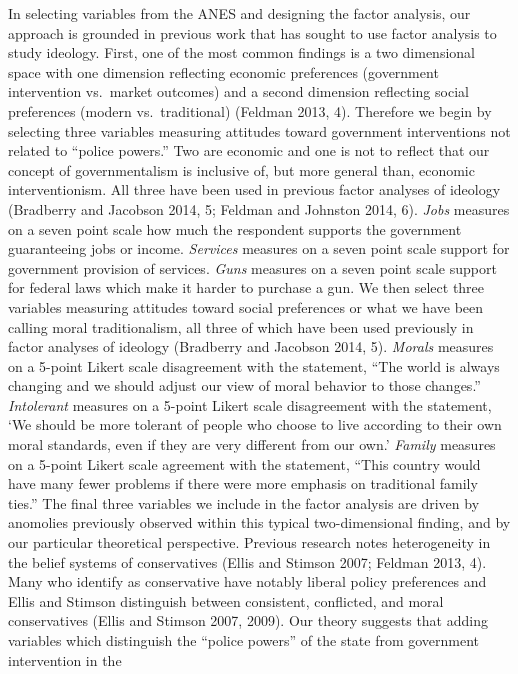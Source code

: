 \documentclass[12pt,]{article}
\begin{document}
In selecting variables from the ANES and designing the factor analysis,
our approach is grounded in previous work that has sought to use factor
analysis to study ideology. First, one of the most common findings is a
two dimensional space with one dimension reflecting economic preferences
(government intervention vs.~market outcomes) and a second dimension
reflecting social preferences (modern vs.~traditional) (Feldman 2013,
4). Therefore we begin by selecting three variables measuring attitudes
toward government interventions not related to ``police powers.'' Two
are economic and one is not to reflect that our concept of
governmentalism is inclusive of, but more general than, economic
interventionism. All three have been used in previous factor analyses of
ideology (Bradberry and Jacobson 2014, 5; Feldman and Johnston 2014, 6).
\emph{Jobs} measures on a seven point scale how much the respondent
supports the government guaranteeing jobs or income. \emph{Services}
measures on a seven point scale support for government provision of
services. \emph{Guns} measures on a seven point scale support for
federal laws which make it harder to purchase a gun. We then select
three variables measuring attitudes toward social preferences or what we
have been calling moral traditionalism, all three of which have been
used previously in factor analyses of ideology (Bradberry and Jacobson
2014, 5). \emph{Morals} measures on a 5-point Likert scale disagreement
with the statement, ``The world is always changing and we should adjust
our view of moral behavior to those changes.'' \emph{Intolerant}
measures on a 5-point Likert scale disagreement with the statement, `We
should be more tolerant of people who choose to live according to their
own moral standards, even if they are very different from our own.'
\emph{Family} measures on a 5-point Likert scale agreement with the
statement, ``This country would have many fewer problems if there were
more emphasis on traditional family ties.'' The final three variables we
include in the factor analysis are driven by anomolies previously
observed within this typical two-dimensional finding, and by our
particular theoretical perspective. Previous research notes
heterogeneity in the belief systems of conservatives (Ellis and Stimson
2007; Feldman 2013, 4). Many who identify as conservative have notably
liberal policy preferences and Ellis and Stimson distinguish between
consistent, conflicted, and moral conservatives (Ellis and Stimson 2007,
2009). Our theory suggests that adding variables which distinguish the
``police powers'' of the state from government intervention in the
\end{document}
